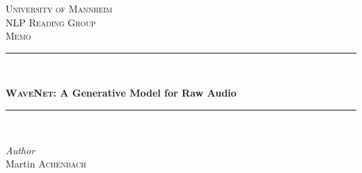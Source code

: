 \hypersetup{pageanchor=false}
\begin{titlepage} %
	\newcommand{\HRule}{\rule{\linewidth}{0.5mm}} %
	
	\center %
	
	
	\textsc{\LARGE University of Mannheim}\\[1.5cm] %
	
	\textsc{\Large NLP Reading Group}\\[0.5cm] %
	
	\textsc{\large Memo}\\[0.5cm] %
	
	
	\HRule\\[0.4cm]
	
	\begin{doublespace}
		{\huge\bfseries \textsc{WaveNet}: A Generative Model for Raw Audio \parencite{oord_wavenet:_2016}} \\[0.1cm] %
	\end{doublespace}
	
	\HRule\\[1.5cm]
	
	
	\begin{center}
		\large
		\textit{Author}\\
		Martin \textsc{Achenbach}\\ %
		\hfill
	\end{center}
	
	
	

\end{titlepage}
